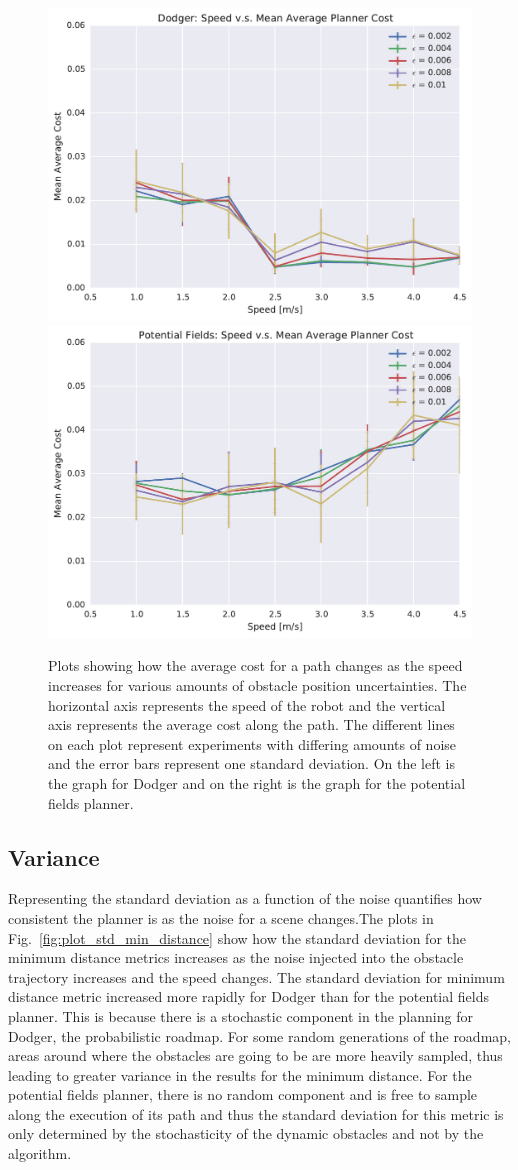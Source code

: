 \begin{figure}[h!]
    \centering
    \includegraphics[width=0.48\linewidth]{figs/planner_mean_avg_cost_0}
    \includegraphics[width=0.48\linewidth]{figs/pf_mean_avg_cost_0}

    \caption{Plots showing how the average cost for a path changes as the
        speed increases for various amounts of obstacle position uncertainties.
        The horizontal axis represents the speed of the robot and the vertical
        axis represents the average cost along the path. The different lines on
    each plot represent experiments with differing amounts of noise and the
error bars represent one standard deviation.  On the left is the graph for
Dodger and on the right is the graph for the potential fields planner.}

    \label{fig:plot_avg_cost}
\end{figure}

\subsection{Variance}

Representing the standard deviation as a function of the noise quantifies how
consistent the planner is as the noise for a scene changes.The plots in
Fig.~\ref{fig:plot_std_min_distance} show how the standard deviation for the
minimum distance metrics increases as the noise injected into the obstacle
trajectory increases and the speed changes. The standard deviation for minimum
distance metric increased more rapidly for Dodger than for the potential fields
planner.  This is because there is a stochastic component in the planning for
Dodger, the probabilistic roadmap. For some random generations of the roadmap,
areas around where the obstacles are going to be are more heavily sampled, thus
leading to greater variance in the results for the minimum distance. For the
potential fields planner, there is no random component and is free to sample
along the execution of its path and thus the standard deviation for this metric
is only determined by the stochasticity of the dynamic obstacles and not by the
algorithm.

